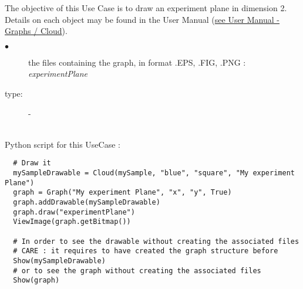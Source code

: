 \renewcommand{\filename}{docUC_MinMax_ExpPlaneDrawing.tex}
\renewcommand{\filetitle}{UC : Drawing an experiment plane in dimension 2 }

\HeaderIIILevel





The objective of this Use Case is to draw an experiment plane in dimension 2.\\


Details on each object may be found in the User Manual  (\href{OpenTURNS_UserManual_TUI.pdf}{see User Manual - Graphs / Cloud}).\\


{
  \begin{description}
  \item[$\bullet$] the files containing the graph, in format .EPS, .FIG, .PNG : {\itshape experimentPlane}
  \item[type:] -
  \end{description}
}

\textspace\\
Python script for this UseCase :


\begin{lstlisting}
  # Draw it
  mySampleDrawable = Cloud(mySample, "blue", "square", "My experiment Plane")
  graph = Graph("My experiment Plane", "x", "y", True)
  graph.addDrawable(mySampleDrawable)
  graph.draw("experimentPlane")
  ViewImage(graph.getBitmap())

  # In order to see the drawable without creating the associated files
  # CARE : it requires to have created the graph structure before
  Show(mySampleDrawable)
  # or to see the graph without creating the associated files
  Show(graph)
\end{lstlisting}

